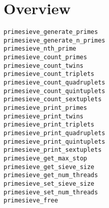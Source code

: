 \documentclass{report}
\begin{document}
\section{Overview}
\begin{description}
\item[\texttt{\begin{ttfamily}primesieve{\_}iterator\end{ttfamily} Record}]
\item[\texttt{\begin{ttfamily}tuplets{\_}iterator\end{ttfamily} Record}]
\end{description}
\begin{description}
\item[\texttt{primesieve{\_}generate{\_}primes}]
\item[\texttt{primesieve{\_}generate{\_}n{\_}primes}]
\item[\texttt{primesieve{\_}nth{\_}prime}]
\item[\texttt{primesieve{\_}count{\_}primes}]
\item[\texttt{primesieve{\_}count{\_}twins}]
\item[\texttt{primesieve{\_}count{\_}triplets}]
\item[\texttt{primesieve{\_}count{\_}quadruplets}]
\item[\texttt{primesieve{\_}count{\_}quintuplets}]
\item[\texttt{primesieve{\_}count{\_}sextuplets}]
\item[\texttt{primesieve{\_}print{\_}primes}]
\item[\texttt{primesieve{\_}print{\_}twins}]
\item[\texttt{primesieve{\_}print{\_}triplets}]
\item[\texttt{primesieve{\_}print{\_}quadruplets}]
\item[\texttt{primesieve{\_}print{\_}quintuplets}]
\item[\texttt{primesieve{\_}print{\_}sextuplets}]
\item[\texttt{primesieve{\_}get{\_}max{\_}stop}]
\item[\texttt{primesieve{\_}get{\_}sieve{\_}size}]
\item[\texttt{primesieve{\_}get{\_}num{\_}threads}]
\item[\texttt{primesieve{\_}set{\_}sieve{\_}size}]
\item[\texttt{primesieve{\_}set{\_}num{\_}threads}]
\item[\texttt{primesieve{\_}free}]

\end{description}
\end{document}
